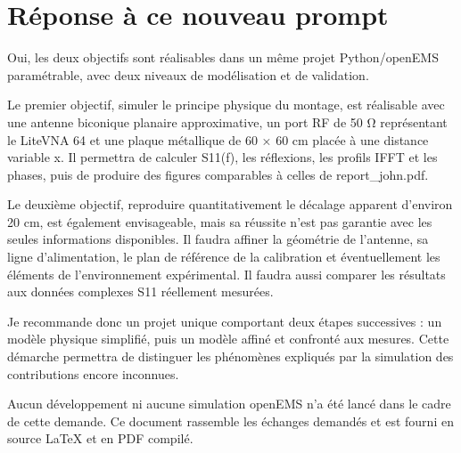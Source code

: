 \documentclass[11pt,a4paper]{article}
\begin{document}
\section{Réponse à ce nouveau prompt}
Oui, les deux objectifs sont réalisables dans un même projet Python/openEMS paramétrable, avec deux niveaux de modélisation et de validation.\par
\par\medskip
Le premier objectif, simuler le principe physique du montage, est réalisable avec une antenne biconique planaire approximative, un port RF de 50 Ω représentant le LiteVNA 64 et une plaque métallique de 60 × 60 cm placée à une distance variable x. Il permettra de calculer S11(f), les réflexions, les profils IFFT et les phases, puis de produire des figures comparables à celles de report\_john.pdf.\par
\par\medskip
Le deuxième objectif, reproduire quantitativement le décalage apparent d'environ 20 cm, est également envisageable, mais sa réussite n'est pas garantie avec les seules informations disponibles. Il faudra affiner la géométrie de l'antenne, sa ligne d'alimentation, le plan de référence de la calibration et éventuellement les éléments de l'environnement expérimental. Il faudra aussi comparer les résultats aux données complexes S11 réellement mesurées.\par
\par\medskip
Je recommande donc un projet unique comportant deux étapes successives : un modèle physique simplifié, puis un modèle affiné et confronté aux mesures. Cette démarche permettra de distinguer les phénomènes expliqués par la simulation des contributions encore inconnues.\par
\par\medskip
Aucun développement ni aucune simulation openEMS n'a été lancé dans le cadre de cette demande. Ce document rassemble les échanges demandés et est fourni en source LaTeX et en PDF compilé.\par
\newpage
\end{document}
